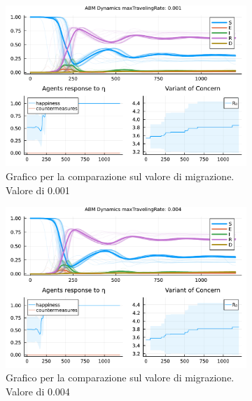\begin{figure}[!hb]
	\centering
	\begin{subfigure}[b]{0.45\textwidth}
		\centering
		\includegraphics[width=\textwidth]{img/SocialNetworkABM_1_MTR.pdf}
		\caption{Grafico per la comparazione sul valore di migrazione. Valore di 0.001}
		\label{fig:comparison_maxTravelingRate_low}
	\end{subfigure}
	\hfill
	\begin{subfigure}[b]{0.45\textwidth}
		\centering
		\includegraphics[width=\textwidth]{img/SocialNetworkABM_2_MTR.pdf}
		\caption{Grafico per la comparazione sul valore di migrazione. Valore di 0.004}
		\label{fig:comparison_maxTravelingRate_midl}
	\end{subfigure}
	\hfill
	\begin{subfigure}[b]{0.45\textwidth}
		\centering

\end{subfigure}
\end{figure}
